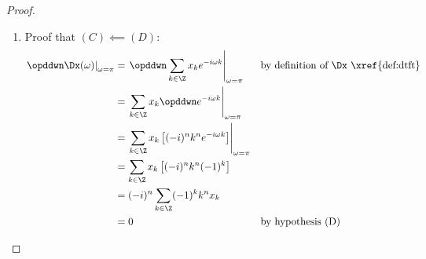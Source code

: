 \begin{proof}
\begin{enumerate}
  \item Proof that $(C)\impliedby(D)$: 
    \begin{align*}
      \left.\opddwn \Dx(\omega)\right|_{\omega=\pi}
        &= \left.\opddwn \sum_{k\in\Z} x_k e^{-i\omega k} \right|_{\omega=\pi}
        && \text{by definition of $\Dx$ \xref{def:dtft}}
      \\&= \left. \sum_{k\in\Z} x_k \opddwn e^{-i\omega k} \right|_{\omega=\pi}
      \\&= \left. \sum_{k\in\Z} x_k \left[(-i)^n k^n e^{-i\omega k}\right] \right|_{\omega=\pi}
      \\&= \sum_{k\in\Z} x_k \left[(-i)^n k^n (-1)^k\right]
      \\&= (-i)^n \sum_{k\in\Z} (-1)^k k^n x_k 
      \\&= 0
        && \text{by hypothesis (D)}
    \end{align*}
\end{enumerate}
\end{proof}





